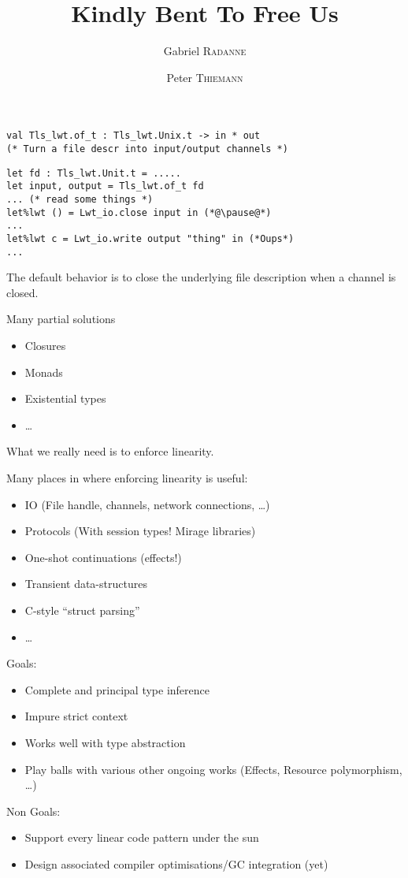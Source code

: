 \documentclass[xcolor=svgnames,11pt]{beamer}
\title{Kindly Bent To Free Us}
\author{Gabriel \textsc{Radanne} \and Peter \textsc{Thiemann}}
\begin{document}
\frame[plain]{\titlepage}

\begin{frame}

\begin{lstlisting}
val Tls_lwt.of_t : Tls_lwt.Unix.t -> in * out
(* Turn a file descr into input/output channels *)
\end{lstlisting}\pause
\begin{lstlisting}
let fd : Tls_lwt.Unit.t = .....
let input, output = Tls_lwt.of_t fd
... (* read some things *)
let%lwt () = Lwt_io.close input in (*@\pause@*)
...
let%lwt c = Lwt_io.write output "thing" in (*Oups*)
...
\end{lstlisting}
  \pause

  The default behavior is to close the underlying file description when a channel is closed.
\end{frame}

\begin{frame}
  Many partial solutions
  \begin{itemize}
  \item Closures
  \item Monads
  \item Existential types
  \item \dots
  \end{itemize}
  \pause

  What we really need is to enforce linearity.
\end{frame}

\begin{frame}
  Many places in \ocaml where enforcing linearity is useful:
  \begin{itemize}
  \item IO (File handle, channels, network connections, \dots)
  \item Protocols (With session types! Mirage libraries)
  \item One-shot continuations (effects!)
  \item Transient data-structures
  \item C-style ``struct parsing''
  \item \dots
  \end{itemize}
\end{frame}

\begin{frame}
  Goals:
  \begin{itemize}
  \item Complete and principal type inference
  \item Impure strict context
  \item Works well with type abstraction
  \item Play balls with various other ongoing works (Effects, Resource polymorphism, \dots)
  \end{itemize}

  \pause
  Non Goals:
  \begin{itemize}
  \item Support every linear code pattern under the sun
  \item Design associated compiler optimisations/GC integration (yet)
  \end{itemize}
\end{frame}
\end{document}
